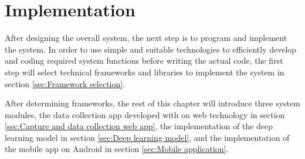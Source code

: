 \chapter{Implementation}
\label{chap:Implementation}
After designing the overall system, the next step is to program and implement the system.
In order to use simple and suitable technologies to efficiently develop and coding required system functions before writing the actual code, the first step will select technical frameworks and libraries to implement the system in section \ref{sec:Framework selection}.

After determining frameworks, the rest of this chapter will introduce three system modules, the data collection app developed with on web technology in section \ref{sec:Capture and data collection web app}, the implementation of the deep learning model in section \ref{sec:Deep learning model}, and the implementation of the mobile app on Android in section \ref{sec:Mobile application}.




